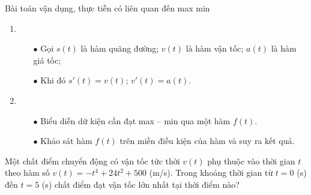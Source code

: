 
\begin{dang}{Bài toán vận dụng, thực tiễn có liên quan đến max min}
	\begin{enumerate}[\iconMT]
		\item {}
		\begin{itemize}
			\item [$\bullet$] Gọi $s(t)$ là hàm quãng đường; $v(t)$ là hàm vận tốc; $a(t)$ là hàm giá tốc;
			\item [$\bullet$] Khi đó $s'(t)=v(t)$; $v'(t)=a(t)$.
		\end{itemize}
		\item {}
		\begin{itemize}
			\item[$\bullet$] Biểu diễn dữ kiện cần đạt max -- min qua một hàm $f(t)$. 
			\item[$\bullet$] Khảo sát hàm $f(t)$ trên miền điều kiện của hàm và suy ra kết quả.
		\end{itemize}
	\end{enumerate}
\end{dang}
\begin{vd}%
	Một chất điểm chuyển động có vận tốc tức thời $v(t)$ phụ thuộc vào thời gian $t$ theo hàm số $v(t)=-t^4+24t^2+500$ (m/s). Trong khoảng thời gian từ $t=0$ (s) đến $t=5$ (s) chất điểm đạt vận tốc lớn nhất tại thời điểm nào?
\end{vd}

